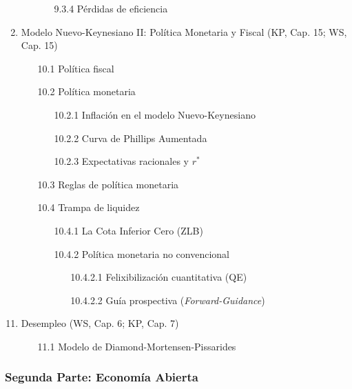 \documentclass[12pt]{article}
\begin{document}
\begin{enumerate}
\begin{enumerate}
\begin{enumerate}
        \item[9.3.4] Pérdidas de eficiencia
        \end{enumerate}
    \end{enumerate}
    \item Modelo Nuevo-Keynesiano II: Política Monetaria y Fiscal (KP, Cap. 15; WS, Cap. 15)
    \begin{enumerate}
        \item[10.1] Política fiscal
        \item[10.2] Política monetaria
        \begin{enumerate}
            \item[10.2.1] Inflación en el modelo Nuevo-Keynesiano
            \item[10.2.2] Curva de Phillips Aumentada
            \item[10.2.3] Expectativas racionales y $r^*$
        \end{enumerate}
        \item[10.3] Reglas de política monetaria
        \item[10.4] Trampa de liquidez
        \begin{enumerate}
            \item[10.4.1] La Cota Inferior Cero (ZLB)
            \item [10.4.2] Política monetaria no convencional
            \begin{enumerate}
                \item[10.4.2.1] Felixibilización cuantitativa (QE)
                \item[10.4.2.2] Guía prospectiva (\textit{Forward-Guidance})
            \end{enumerate}
        \end{enumerate}
    \end{enumerate}
\end{enumerate}

\newpage
\begin{enumerate}
\setcounter{enumi}{10}
    \item Desempleo (WS, Cap. 6; KP, Cap. 7)
     \begin{enumerate}
         \item[11.1] Modelo de Diamond-Mortensen-Pissarides
     \end{enumerate}
\end{enumerate}


\subsubsection*{Segunda Parte: Economía Abierta}
\end{document}
